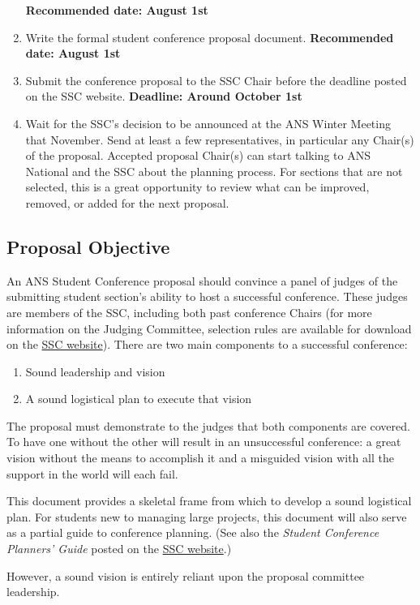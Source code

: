 \documentclass[12pt]{article}
\begin{document}
\begin{enumerate}
{\textbf{Recommended date: August 1st}}
\item{Write the formal student conference proposal document. \textbf{Recommended date: August 1st}}
\item{Submit the conference proposal to the SSC Chair before the
deadline posted on the SSC website. \textbf{Deadline: Around October 1st}}
\item{Wait for the SSC’s decision to be announced at the ANS Winter Meeting that November. Send at least a few representatives, in particular any Chair(s) of the proposal. Accepted proposal Chair(s) can start talking to ANS National and the SSC about the planning process. For sections that are not selected, this is a great opportunity to review what can be improved, removed, or added for the next proposal.}
\end{enumerate}

\subsection{Proposal Objective}
An ANS Student Conference proposal should convince a panel of judges of the submitting student section’s ability to host a successful conference. 
These judges are members of the SSC, including both past conference Chairs (for more information on the Judging Committee, selection rules are available for download on the \href{http://students.ans.org/student-conferences/}{SSC website}).
There are two main
components to a successful conference:
\begin{enumerate}
\item{Sound leadership and vision}
\item{A sound logistical plan to execute that vision}
\end{enumerate}

The proposal must demonstrate to the judges that both components are covered.
To have one without the other will result in an unsuccessful conference: a great vision
without the means to accomplish it and a misguided vision with all the support in the
world will each fail.

This document provides a skeletal frame from which to develop a sound logistical plan.
For students new to managing large projects, this document will also serve as a partial
guide to conference planning. (See also the \textit{Student Conference Planners’ Guide} posted
on the \href{http://students.ans.org/student-conferences/}{SSC website}.)

However, a sound vision is entirely reliant upon the proposal committee leadership.
\end{document}
